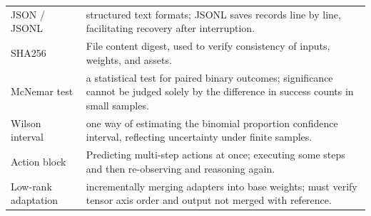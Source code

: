 \begin{longtable}{p{.18\linewidth}p{.72\linewidth}}
JSON / JSONL & structured text formats; JSONL saves records line by line, facilitating recovery after interruption.\\
SHA256 & File content digest, used to verify consistency of inputs, weights, and assets.\\
McNemar test & a statistical test for paired binary outcomes; significance cannot be judged solely by the difference in success counts in small samples.\\
Wilson interval & one way of estimating the binomial proportion confidence interval, reflecting uncertainty under finite samples.\\
Action block & Predicting multi-step actions at once; executing some steps and then re-observing and reasoning again.\\
Low-rank adaptation & incrementally merging adapters into base weights; must verify tensor axis order and output not merged with reference.\\
\bottomrule\end{longtable}
